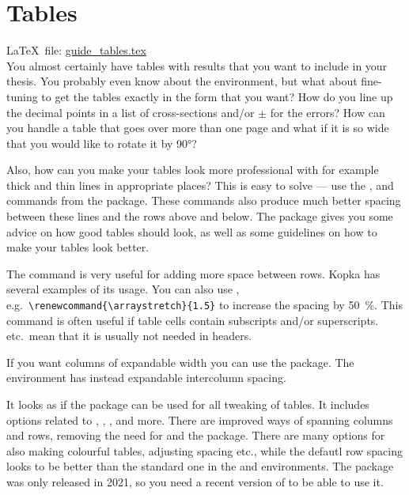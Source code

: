 
\chapter{Tables}%
\label{sec:table}

\LaTeX\ file: \href{run:./guide_tables.tex}{guide\_tables.tex}\\[1ex]
\noindent
You almost certainly have tables with results that you want to include
in your thesis. You probably even know about the 
environment, but what about fine-tuning to get the tables exactly in
the form that you want? How do you line up the decimal points in a
list of cross-sections and/or \(\pm\) for the errors? How can you
handle a table that goes over more than one page and what if it is so
wide that you would like to rotate it by \ang{90}?

Also, how can you make your tables look more professional with for
example thick and thin lines in appropriate places? This is easy to
solve --- use the ,  and 
commands from the  package. These commands also
produce much better spacing between these lines and the rows above and
below. The  package gives you some advice on how
good tables should look, as well as some guidelines on how to make your
tables look better.

The  command is very useful for adding more space between
rows. Kopka has several examples of its usage. You can also use
, e.g.\ \verb+\renewcommand{\arraystretch}{1.5}+ to
increase the spacing by \qty{50}{\percent}. This command is often useful if table
cells contain subscripts and/or superscripts. 
etc.\ mean that it is usually not needed in headers.

If you want columns of expandable width you can use the
 package. The environment  has instead
expandable intercolumn spacing.

It looks as if the package  can be used for all tweaking of tables.
It includes options related to , , ,
 and more.
There are improved ways of spanning columns and rows,
removing the need for  and the  package.
There are many options for also making colourful tables, adjusting spacing etc.,
while the defautl row spacing looks to be better than the standard one in the  and  environments.
The package was only released in 2021, so you need a recent version of \TeXLive to be able to use it.

